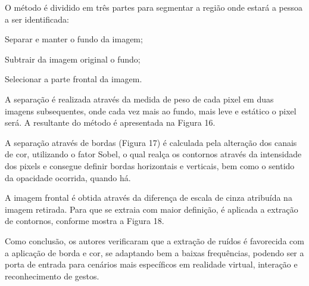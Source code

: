 \documentclass[12pt,oneside,a4paper,chapter=TITLE,section=TITLE,sumario=tradicional]{abntex2}
\begin{document}
\begin{figure}[htb]
\end{figure}

O método é dividido em três partes para segmentar a região onde estará a pessoa a ser identificada:
\begin{lista}
    \item Separar e manter o fundo da imagem;
    \item Subtrair da imagem original o fundo;
    \item Selecionar a parte frontal da imagem.
\end{lista}

A separação é realizada através da medida de peso de cada pixel em duas imagens subsequentes, onde cada vez mais ao fundo, mais leve e estático o pixel será. A resultante do método é apresentada na Figura 16.

\begin{figure}[htb]
\end{figure}

A separação através de bordas (Figura 17) é calculada pela alteração dos canais de cor, utilizando o fator Sobel, o qual realça os contornos através da intensidade dos pixels e consegue definir bordas horizontais e verticais, bem como o sentido da opacidade ocorrida, quando há.

\begin{figure}[htb]
\end{figure}

A imagem frontal é obtida através da diferença de escala de cinza atribuída na imagem retirada. Para que se extraia com maior definição, é aplicada a extração de contornos, conforme mostra a Figura 18.

\begin{figure}[htb]
\end{figure}

Como conclusão, os autores verificaram que a extração de ruídos é favorecida com a aplicação de borda e cor, se adaptando bem a baixas frequências, podendo ser a porta de entrada para cenários mais específicos em realidade virtual, interação e reconhecimento de gestos.
\end{document}
